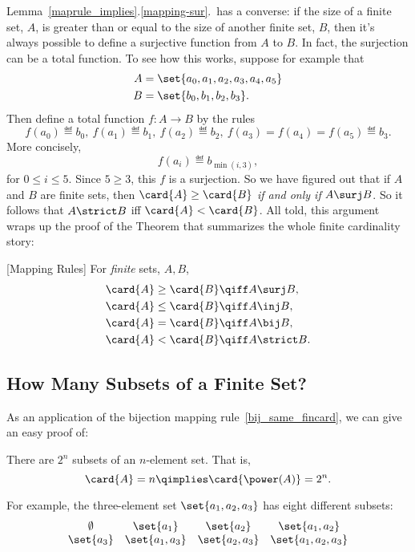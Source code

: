 Lemma~\ref{maprule_implies}.\ref{mapping-sur}.\ has a converse: if the
size of a finite set, $A$, is greater than or equal to the size of
another finite set, $B$, then it's always possible to define a
surjective function from $A$ to $B$.  In fact, the surjection can be a
total function.  To see how this works, suppose for example that
\begin{align*}
A & =\set{a_0,a_1,a_2,a_3,a_4,a_5}\\ B & =\set{b_0,b_1,b_2,b_3}.
\end{align*}
Then define a total function $f:A\to B$ by the rules
\[
f(a_0) \eqdef b_0,\ f(a_1) \eqdef b_1,\ f(a_2) \eqdef b_2,\ f(a_3)=
f(a_4)=f(a_5) \eqdef b_3.
\]
More concisely,
\[
f(a_i) \eqdef b_{\min(i,3)},
\]
for $0 \le i \le 5$.  Since $5 \geq 3$, this $f$ is a surjection.
\iffalse In fact, if $A$ and $B$ are finite sets of the same size,
then we could also define a bijection from $A$ to $B$ by this method.
\fi So we have figured out that if $A$ and $B$ are finite sets, then
$\card{A} \geq \card{B}$ \emph{if and only if} $A \surj B$.  So it
follows that $A \strict B$ iff $\card{A} < \card{B}$.  All told, this
argument wraps up the proof of the Theorem that summarizes the whole
finite cardinality story:
\begin{theorem}\label{maprul_thm}
[Mapping Rules] \mbox{} For \emph{finite} sets, $A,B$,
\begin{align}
\card{A} \geq \card{B} & \qiff A \surj B,\\
\card{A} \leq \card{B} & \qiff A \inj B,\label{inj_le_fincard}\\
\card{A} = \card{B} & \qiff A \bij B,\label{bij_same_fincard}\\
\card{A} < \card{B} & \qiff A \strict B.
\end{align}
\end{theorem}

\subsection{How Many Subsets of a Finite Set?}
As an application of the bijection mapping
rule~\eqref{bij_same_fincard}, we can give an easy proof of:
\begin{theorem}\label{powset_fincard}
There are $2^n$ subsets of an $n$-element set.  That is,
\[
\card{A} = n \qimplies \card{\power(A)} = 2^n.
\]
\end{theorem}

For example, the three-element set $\set{a_1, a_2, a_3}$ has eight
different subsets: %
\[
\begin{array}{cccc}
\emptyset & \set{a_1} & \set{a_2} & \set{a_1, a_2} \\ \set{a_3} &
\set{a_1, a_3} & \set{a_2, a_3} & \set{a_1, a_2, a_3}
\end{array}
\]

